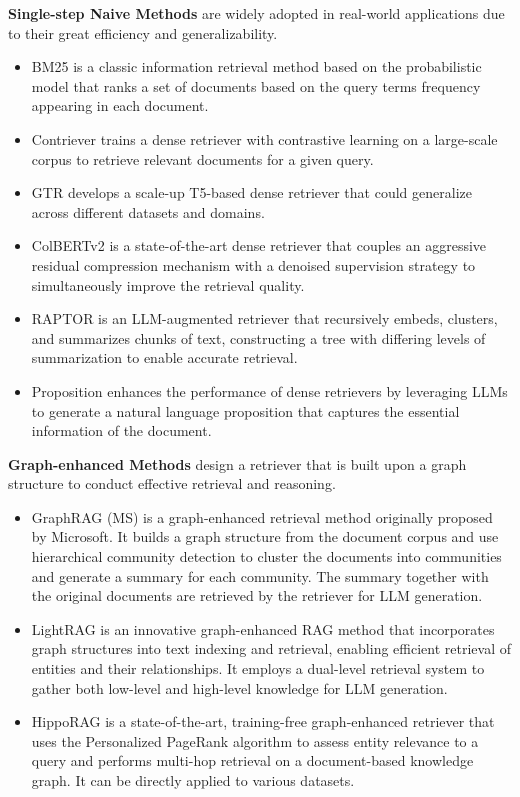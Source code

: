 \noindent\textbf{Single-step Naive Methods} are widely adopted in real-world applications due to their great efficiency and generalizability. 
\begin{itemize}
    \item BM25 \citep{robertson1994some} is a classic information retrieval method based on the probabilistic model that ranks a set of documents based on the query terms frequency appearing in each document.
    \item Contriever \citep{izacardunsupervised} trains a dense retriever with contrastive learning on a large-scale corpus to retrieve relevant documents for a given query.
    \item GTR \citep{ni2022large} develops a scale-up T5-based dense retriever that could generalize across different datasets and domains.
    \item ColBERTv2 \citep{santhanam2022colbertv2} is a state-of-the-art dense retriever that couples an aggressive residual compression mechanism with a denoised supervision strategy to simultaneously improve the retrieval quality.
    \item RAPTOR \citep{sarthiraptor} is an LLM-augmented retriever that recursively embeds, clusters, and summarizes chunks of text, constructing a tree with differing levels of summarization to enable accurate retrieval.
    \item Proposition \citep{chen-etal-2024-dense} enhances the performance of dense retrievers by leveraging LLMs to generate a natural language proposition that captures the essential information of the document.
\end{itemize}

\noindent\textbf{Graph-enhanced Methods} design a retriever that is built upon a graph structure to conduct effective retrieval and reasoning.
\begin{itemize}
    \item GraphRAG (MS) \citep{edge2024local} is a graph-enhanced retrieval method originally proposed by Microsoft. It builds a graph structure from the document corpus and use hierarchical community detection to cluster the documents into communities and generate a summary for each community. The summary together with the original documents are retrieved by the retriever for LLM generation. 
    \item LightRAG \citep{guo2024lightrag} is an innovative graph-enhanced RAG method that incorporates graph structures into text indexing and retrieval, enabling efficient retrieval of entities and their relationships. It employs a dual-level retrieval system to gather both low-level and high-level knowledge for LLM generation.
    \item HippoRAG \citep{gutiérrez2024hipporag} is a state-of-the-art, training-free graph-enhanced retriever that uses the Personalized PageRank algorithm to assess entity relevance to a query and performs multi-hop retrieval on a document-based knowledge graph. It can be directly applied to various datasets.
\end{itemize}

